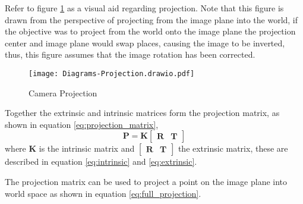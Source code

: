         Refer to figure \ref{fig:projection} as a visual aid regarding projection. Note that this figure is drawn from the perspective of projecting from the image plane into the world,
        if the objective was to project from the world onto the image plane the projection center and image plane would swap places, causing the image to be inverted, thus, this figure assumes
        that the image rotation has been corrected.
        \begin{figure}[h]
            \centering
            \texttt{[image: Diagrams-Projection.drawio.pdf]}
            \caption{Camera Projection}
            \label{fig:projection}
        \end{figure}

        \noindent
        Together the extrinsic and intrinsic matrices form the projection matrix,
        as shown in equation \ref{eq:projection_matrix},
        \begin{equation} \label{eq:projection_matrix}
            \bm{P} = \bm{K}
            \begin{bmatrix}
                \bm{R} & \bm{T}
            \end{bmatrix}
        \end{equation}
        where \(\bm{K}\) is the intrinsic matrix and \(\begin{bmatrix} \bm{R} & \bm{T} \end{bmatrix}\) the extrinsic matrix, these are described
        in equation \ref{eq:intrinsic} and \ref{eq:extrinsic}.

        The projection matrix can be used to project a point on the image plane into world space as shown in equation \ref{eq:full_projection}.

